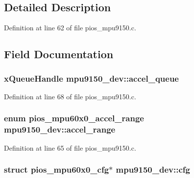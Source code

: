 \subsection{\-Detailed \-Description}


\-Definition at line 62 of file pios\-\_\-mpu9150.\-c.



\subsection{\-Field \-Documentation}
\hypertarget{structmpu9150__dev_a0479e62f94e5c609f61aed2bacc34c16}{
\subsubsection[{accel\-\_\-queue}]{\setlength{\rightskip}{0pt plus 5cm}x\-Queue\-Handle {\bf mpu9150\-\_\-dev\-::accel\-\_\-queue}}}\label{structmpu9150__dev_a0479e62f94e5c609f61aed2bacc34c16}


\-Definition at line 68 of file pios\-\_\-mpu9150.\-c.

\hypertarget{structmpu9150__dev_a94560142ddd8f04665c54db25dec298e}{
\subsubsection[{accel\-\_\-range}]{\setlength{\rightskip}{0pt plus 5cm}enum {\bf pios\-\_\-mpu60x0\-\_\-accel\-\_\-range} {\bf mpu9150\-\_\-dev\-::accel\-\_\-range}}}\label{structmpu9150__dev_a94560142ddd8f04665c54db25dec298e}


\-Definition at line 65 of file pios\-\_\-mpu9150.\-c.

\hypertarget{structmpu9150__dev_a4580e544e9fab8e6853bdeee1ef58de1}{
\subsubsection[{cfg}]{\setlength{\rightskip}{0pt plus 5cm}struct {\bf pios\-\_\-mpu60x0\-\_\-cfg}$\ast$ {\bf mpu9150\-\_\-dev\-::cfg}}}\label{structmpu9150__dev_a4580e544e9fab8e6853bdeee1ef58de1}


